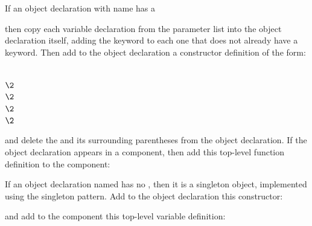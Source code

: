 If an object declaration with name  has a 
\begin{codeexamplesize}
\begin{tabbing}
\end{tabbing}
\end{codeexamplesize}
then copy each variable declaration  from the parameter list into the
object declaration itself, adding the  keyword
to each one that does not already have a  keyword.
Then add to the object declaration a constructor definition of the form:
\begin{codeexamplesize}
\begin{tabbing}
 \\
\(\2\) \\
\(\2\) \\
\(\2\)\EXP{\ldots} \\
\(\2\) \\
\end{tabbing}
\end{codeexamplesize}
and delete the  and its surrounding parentheses
from the object declaration.  If the object declaration appears in a component,
then add this top-level function definition to the component:
\begin{codeexamplesize}
\begin{tabbing}
\end{tabbing}
\end{codeexamplesize}

If an object declaration named  has no ,
then it is a singleton object, implemented using the
singleton pattern.
Add to the object declaration this constructor:
\begin{codeexamplesize}
\begin{tabbing}
\end{tabbing}
\end{codeexamplesize}
and add to the component this top-level variable definition:
\begin{tabbing}
\end{tabbing}

